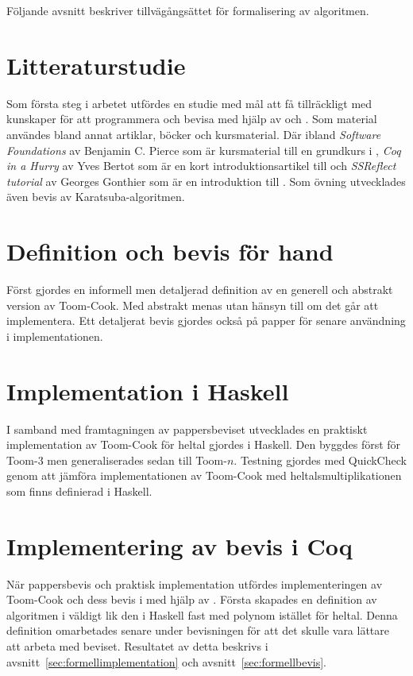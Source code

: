 Följande avsnitt beskriver tillvägångsättet för formalisering av algoritmen.

\section{Litteraturstudie}
Som första steg i arbetet utfördes en studie med mål att få tillräckligt med
kunskaper för att programmera och bevisa med hjälp av \coq och \ssr. Som
material användes bland annat artiklar, böcker och kursmaterial. Där ibland
\emph{Software Foundations} av Benjamin C. Pierce som är kursmaterial till en
grundkurs i \coq, \emph{Coq in a Hurry} av Yves Bertot som är en kort
introduktionsartikel till \coq och \emph{SSReflect tutorial} av Georges
Gonthier som är en introduktion till \ssr. Som övning utvecklades även bevis av
Karatsuba-algoritmen.

\section{Definition och bevis för hand}
Först gjordes en informell men detaljerad definition av en generell och
abstrakt version av Toom-Cook. Med abstrakt menas utan hänsyn till om det går
att implementera. Ett detaljerat bevis gjordes också på papper för senare
användning i implementationen.

\section{Implementation i Haskell}
I samband med framtagningen av pappersbeviset utvecklades en praktiskt
implementation av Toom-Cook för heltal gjordes i Haskell. Den byggdes först för
Toom-3 men generaliserades sedan till Toom-$n$. Testning gjordes med QuickCheck
genom att jämföra implementationen av Toom-Cook med heltalsmultiplikationen som
finns definierad i Haskell.

\section{Implementering av bevis i Coq}
När pappersbevis och praktisk implementation utfördes implementeringen av
Toom-Cook och dess bevis i \coq med hjälp av \ssr. Första skapades en
definition av algoritmen i \coq väldigt lik den i Haskell fast med polynom
istället för heltal. Denna definition omarbetades senare under bevisningen för
att det skulle vara lättare att arbeta med beviset. Resultatet av detta
beskrivs i avsnitt~\ref{sec:formellimplementation} och
avsnitt~\ref{sec:formellbevis}.

